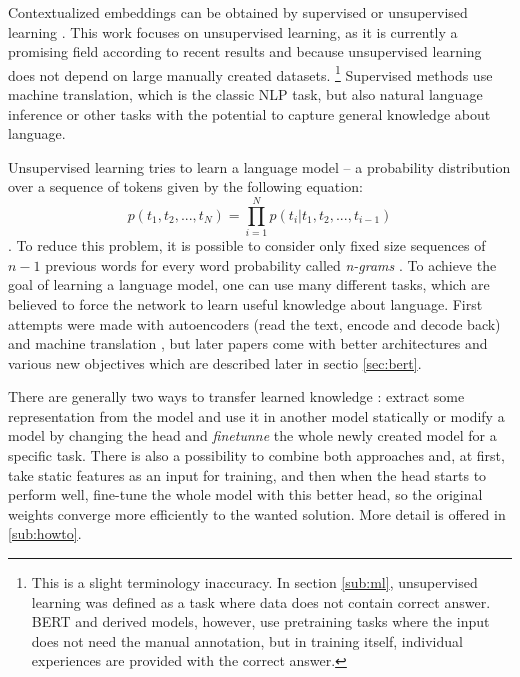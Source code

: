 Contextualized embeddings can be obtained by supervised or unsupervised learning \citep{Liu2020}. This work focuses on unsupervised learning, as it is currently a promising field according to recent results and because unsupervised learning does not depend on large manually created datasets. \footnote{This is a slight terminology inaccuracy. In section \ref{sub:ml}, unsupervised learning was defined as a task where data does not contain correct answer. BERT and derived models, however, use pretraining tasks where the input does not need the manual annotation, but in training itself, individual experiences are provided with the correct answer.} Supervised methods use machine translation, which is the classic NLP task, but also natural language inference or other tasks with the potential to capture general knowledge about language.

Unsupervised learning tries to learn a language model -- a probability distribution over a sequence of tokens given by the following equation:
 \begin{equation*}
  p(t_1, t_2,...,t_N) =\prod_{i=1}^{N} p(t_i | t_1, t_2, ..., t_{i-1})
\end{equation*} \citep{Liu2020}. To reduce this problem, it is possible to consider only fixed size sequences of $n-1$ previous words for every word probability called \textit{n-grams} \citep{Bengio2003}.
To achieve the goal of learning a language model, one can use many different tasks, which are believed to force the network to learn useful knowledge about language. 
First attempts were made with autoencoders (read the text, encode and decode back) \citep{Dai2015} and machine translation \citep{Ramachandran2017}, but later papers come with better architectures and various new objectives which are described later in sectio \ref{sec:bert}. %


There are generally two ways to transfer learned knowledge \citep{Feijo2020}: extract some representation from the model and use it in another model statically or modify a model by changing the head and \textit{finetunne} the whole newly created model for a specific task. There is also a possibility to combine both approaches and, at first, take static features as an input for training, and then when the head starts to perform well, fine-tune the whole model with this better head, so the original weights converge more efficiently to the wanted solution. More detail is offered in \ref{sub:howto}.


